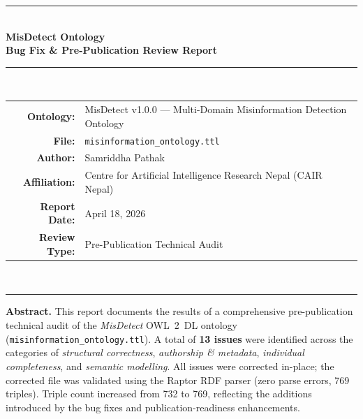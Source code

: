 \documentclass[11pt, a4paper]{article}
\begin{document}
\begin{center}
  {\color{cair-dark}\rule{\linewidth}{1.5pt}}\\[8pt]
  {\LARGE\bfseries\color{cair-dark}
    MisDetect Ontology\\[4pt]
    Bug Fix \& Pre-Publication Review Report}\\[8pt]
  {\color{cair-mid}\rule{\linewidth}{0.8pt}}\\[10pt]
  \begin{tabular}{rl}
    \textbf{Ontology:}   & MisDetect v1.0.0 --- Multi-Domain Misinformation Detection Ontology \\
    \textbf{File:}       & \texttt{misinformation\_ontology.ttl} \\
    \textbf{Author:}     & Samriddha Pathak \\
    \textbf{Affiliation:}& Centre for Artificial Intelligence Research Nepal (CAIR Nepal) \\
    \textbf{Report Date:}& April 18, 2026 \\
    \textbf{Review Type:}& Pre-Publication Technical Audit \\
  \end{tabular}\\[8pt]
  {\color{cair-mid}\rule{\linewidth}{0.8pt}}
\end{center}
\vspace{4pt}

\begin{infobox}
\textbf{\faInfoCircle\quad Abstract.}\quad
This report documents the results of a comprehensive pre-publication technical
audit of the \emph{MisDetect} OWL~2~DL ontology
(\texttt{misinformation\_ontology.ttl}).
A total of \textbf{13 issues} were identified across the categories of
\emph{structural correctness}, \emph{authorship \& metadata},
\emph{individual completeness}, and \emph{semantic modelling}.
All issues were corrected in-place; the corrected file was validated
using the Raptor RDF parser (zero parse errors, 769 triples).
Triple count increased from 732 to 769, reflecting the additions introduced
by the bug fixes and publication-readiness enhancements.
\end{infobox}

\vspace{4pt}
\tableofcontents
\vspace{6pt}

\end{document}
